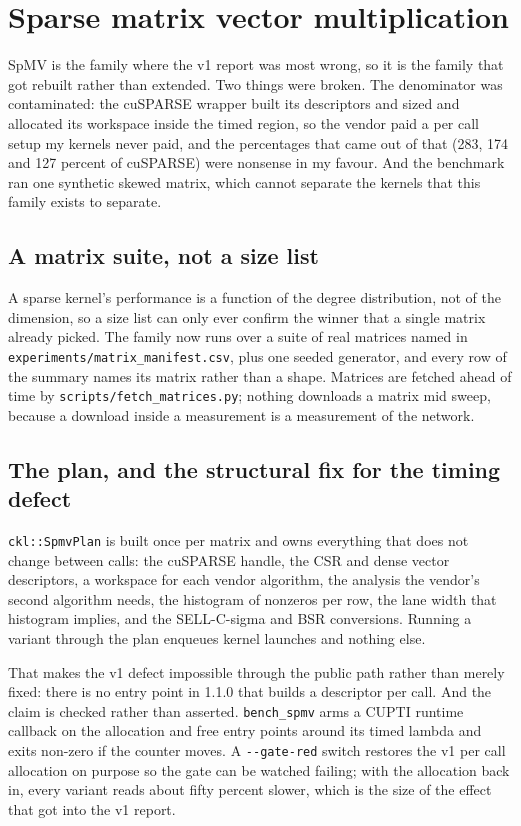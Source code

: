 \section{Sparse matrix vector multiplication}
\label{sec:sparse}

SpMV is the family where the v1 report was most wrong, so it is the family that
got rebuilt rather than extended. Two things were broken. The denominator was
contaminated: the cuSPARSE wrapper built its descriptors and sized and allocated
its workspace inside the timed region, so the vendor paid a per call setup my
kernels never paid, and the percentages that came out of that (283, 174 and 127
percent of cuSPARSE) were nonsense in my favour. And the benchmark ran one
synthetic skewed matrix, which cannot separate the kernels that this family exists
to separate.

\subsection{A matrix suite, not a size list}

A sparse kernel's performance is a function of the degree distribution, not of the
dimension, so a size list can only ever confirm the winner that a single matrix
already picked. The family now runs over a suite of real matrices named in
\texttt{experiments/matrix\_manifest.csv}, plus one seeded generator, and every row
of the summary names its matrix rather than a shape. Matrices are fetched ahead of
time by \texttt{scripts/fetch\_matrices.py}; nothing downloads a matrix mid sweep,
because a download inside a measurement is a measurement of the network.

\subsection{The plan, and the structural fix for the timing defect}

\texttt{ckl::SpmvPlan} is built once per matrix and owns everything that does not
change between calls: the cuSPARSE handle, the CSR and dense vector descriptors, a
workspace for each vendor algorithm, the analysis the vendor's second algorithm
needs, the histogram of nonzeros per row, the lane width that histogram implies,
and the SELL-C-sigma and BSR conversions. Running a variant through the plan
enqueues kernel launches and nothing else.

That makes the v1 defect impossible through the public path rather than merely
fixed: there is no entry point in 1.1.0 that builds a descriptor per call. And the
claim is checked rather than asserted. \texttt{bench\_spmv} arms a CUPTI runtime
callback on the allocation and free entry points around its timed lambda and exits
non-zero if the counter moves. A \texttt{-{}-gate-red} switch restores the v1 per
call allocation on purpose so the gate can be watched failing; with the allocation
back in, every variant reads about fifty percent slower, which is the size of the
effect that got into the v1 report.

